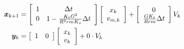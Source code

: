 \begin{align}
  \bm x_{k+1} &= \left[
  \begin{array}{cc}
    1 & \Delta t \\
    0 & 1 - \frac{K_t G^2}{R^2rmK_v} \Delta t
  \end{array}
  \right] \left[
  \begin{array}{c}
    x_k \\
    v_{m,k} \\
  \end{array}
  \right] + \left[
  \begin{array}{c}
    0 \\
    \frac{GK_t}{Rrm} \Delta t
  \end{array}
  \right] V_k \\
  \bm y_k &= \left[
  \begin{array}{cc}
    1 & 0
  \end{array}
  \right] \left[
  \begin{array}{c}
    x_k \\
    v_k \\
  \end{array}
  \right] + 0 \cdot V_k
\end{align}
